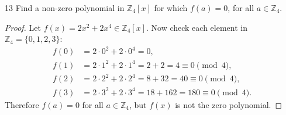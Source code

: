 \begin{problem}{13}
    Find a non-zero polynomial in $\mathbb{Z}_4[x]$ for which $f(a) = 0$,
    for all $a \in \mathbb{Z}_4$.
\end{problem}
\solved


\begin{proof}
    Let $f(x) = 2x^2 + 2x^4 \in \mathbb{Z}_4[x]$.  
    Now check each element in $\mathbb{Z}_4 = \{0,1,2,3\}$:
    \[
    \begin{aligned}
    f(0) &= 2 \cdot 0^2 + 2 \cdot 0^4 = 0, \\
    f(1) &= 2 \cdot 1^2 + 2 \cdot 1^4 = 2 + 2 = 4 \equiv 0 \pmod{4}, \\
    f(2) &= 2 \cdot 2^2 + 2 \cdot 2^4 = 8 + 32 = 40 \equiv 0 \pmod{4}, \\
    f(3) &= 2 \cdot 3^2 + 2 \cdot 3^4 = 18 + 162 = 180 \equiv 0 \pmod{4}.
    \end{aligned}
    \]
    Therefore $f(a) = 0$ for all $a \in \mathbb{Z}_4$, but $f(x)$ is not the zero polynomial.
\end{proof}
